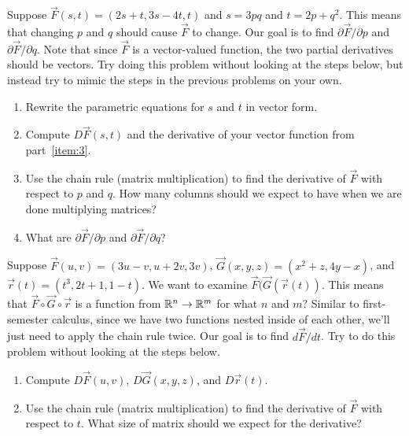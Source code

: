 \begin{problem}
 Suppose $\vec F(s,t) = (2s+t,3s-4t,t)$ and $s=3pq$ and $t=2p+q^2$.  This means that changing $p$ and $q$ should cause $\vec F$ to change. Our goal is to find $\partial \vec F/\partial p$ and $\partial \vec F/\partial q$. Note that since $\vec F$ is a vector-valued function, the two partial derivatives should be vectors. Try doing this problem without looking at the steps below, but instead try to mimic the steps in the previous problems on your own. 
 \begin{enumerate}
  \item\label{item:3} Rewrite the parametric equations for $s$ and $t$ in vector form.
  \item Compute $D\vec F(s,t)$ and the derivative of your vector function from part~\ref{item:3}.
  \item Use the chain rule (matrix multiplication) to find the derivative of $\vec F$ with respect to $p$ and $q$.  How many columns should we expect to have when we are done multiplying matrices?
  \item What are $\partial \vec F/\partial p$ and $\partial \vec F/\partial q$? 
 \end{enumerate}
\end{problem}

\begin{problem}
 Suppose $\vec F(u,v) = (3u-v,u+2v,3v)$,  $\vec G(x,y,z)=(x^2+z, 4y-x)$, and $\vec r(t) = (t^3, 2t+1, 1-t)$.  We want to examine $\vec F(\vec G(\vec r(t))$.  This means that $\vec F\circ \vec G\circ \vec r$ is a function from $\mathbb{R}^n\to\mathbb{R}^m$ for what $n$ and $m$?  Similar to first-semester calculus, since we have two functions nested inside of each other, we'll just need to apply the chain rule twice.  Our goal is to find $d\vec F/dt$.  Try to do this problem without looking at the steps below.
 \begin{enumerate}
  \item Compute $D\vec F(u,v)$, $D\vec G(x,y,z)$, and $D\vec r(t)$.
  \item Use the chain rule (matrix multiplication) to find the derivative of $\vec F$ with respect to $t$.  What size of matrix should we expect for the derivative?
 \end{enumerate}
\end{problem}



